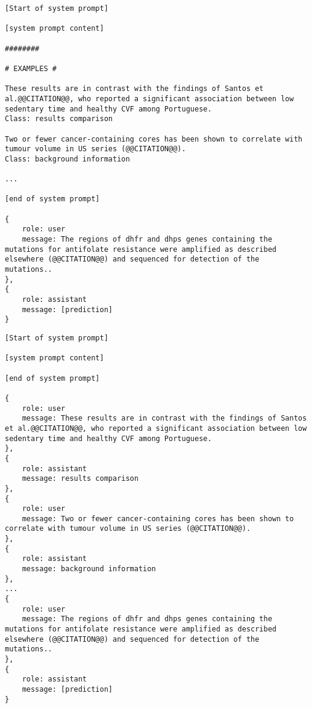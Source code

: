 \newpage

\begin{lstlisting}[caption=Example of the ``Inline'' Examples Method (EM1), label=lst:em1]
[Start of system prompt]

[system prompt content]

########

# EXAMPLES #

These results are in contrast with the findings of Santos et al.@@CITATION@@, who reported a significant association between low sedentary time and healthy CVF among Portuguese.
Class: results comparison

Two or fewer cancer-containing cores has been shown to correlate with tumour volume in US series (@@CITATION@@).
Class: background information

...

[end of system prompt]

{
    role: user
    message: The regions of dhfr and dhps genes containing the mutations for antifolate resistance were amplified as described elsewhere (@@CITATION@@) and sequenced for detection of the mutations..
},
{
    role: assistant
    message: [prediction]
}
\end{lstlisting}


\begin{lstlisting}[caption=Example of the ``Roles'' Examples Method (EM2), label=lst:em2]
[Start of system prompt]

[system prompt content]

[end of system prompt]

{
    role: user
    message: These results are in contrast with the findings of Santos et al.@@CITATION@@, who reported a significant association between low sedentary time and healthy CVF among Portuguese.
},
{
    role: assistant
    message: results comparison
},
{
    role: user
    message: Two or fewer cancer-containing cores has been shown to correlate with tumour volume in US series (@@CITATION@@).
},
{
    role: assistant
    message: background information
},
...
{
    role: user
    message: The regions of dhfr and dhps genes containing the mutations for antifolate resistance were amplified as described elsewhere (@@CITATION@@) and sequenced for detection of the mutations..
},
{
    role: assistant
    message: [prediction]
}
\end{lstlisting}

